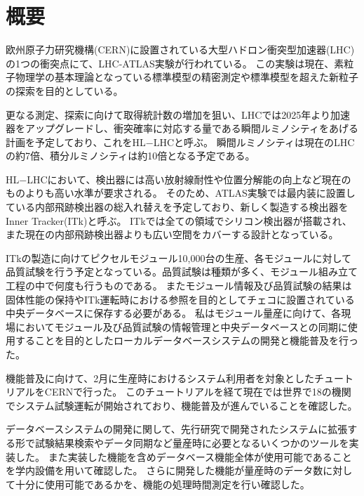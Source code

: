 \chapter*{概要}

欧州原子力研究機構(CERN)に設置されている大型ハドロン衝突型加速器(LHC)の1つの衝突点にて、LHC-ATLAS実験が行われている。
この実験は現在、素粒子物理学の基本理論となっている標準模型の精密測定や標準模型を超えた新粒子の探索を目的としている。

更なる測定、探索に向けて取得統計数の増加を狙い、LHCでは2025年より加速器をアップグレードし、衝突確率に対応する量である瞬間ルミノシティをあげる計画を予定しており、これをHL$-$LHCと呼ぶ。
瞬間ルミノシティは現在のLHCの約7倍、積分ルミノシティは約10倍となる予定である。

HL$-$LHCにおいて、検出器には高い放射線耐性や位置分解能の向上など現在のものよりも高い水準が要求される。
そのため、ATLAS実験では最内装に設置している内部飛跡検出器の総入れ替えを予定しており、新しく製造する検出器をInner Tracker(ITk)と呼ぶ。
ITkでは全ての領域でシリコン検出器が搭載され、また現在の内部飛跡検出器よりも広い空間をカバーする設計となっている。

ITkの製造に向けてピクセルモジュール10,000台の生産、各モジュールに対して品質試験を行う予定となっている。品質試験は種類が多く、モジュール組み立て工程の中で何度も行うものである。
またモジュール情報及び品質試験の結果は固体性能の保持やITk運転時における参照を目的としてチェコに設置されている中央データベースに保存する必要がある。
私はモジュール量産に向けて、各現場においてモジュール及び品質試験の情報管理と中央データベースとの同期に使用することを目的としたローカルデータベースシステムの開発と機能普及を行った。

機能普及に向けて、2月に生産時におけるシステム利用者を対象としたチュートリアルをCERNで行った。
このチュートリアルを経て現在では世界で18の機関でシステム試験運転が開始されており、機能普及が進んでいることを確認した。

データベースシステムの開発に関して、先行研究で開発されたシステムに拡張する形で試験結果検索やデータ同期など量産時に必要となるいくつかのツールを実装した。
また実装した機能を含めデータベース機能全体が使用可能であることを学内設備を用いて確認した。
さらに開発した機能が量産時のデータ数に対して十分に使用可能であるかを、機能の処理時間測定を行い確認した。


